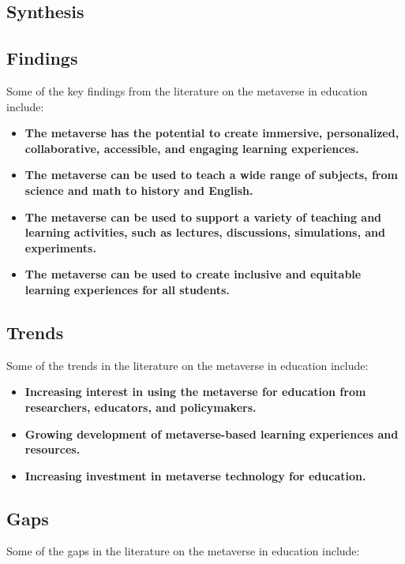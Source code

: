 \documentclass[12pt]{extarticle}
\begin{document}
\subsection{Synthesis}
\subsection*{Findings}

Some of the key findings from the literature on the metaverse in education include:

\begin{itemize}
    \item \textbf{The metaverse has the potential to create immersive, personalized, collaborative, accessible, and engaging learning experiences.}
    \item \textbf{The metaverse can be used to teach a wide range of subjects, from science and math to history and English.}
    \item \textbf{The metaverse can be used to support a variety of teaching and learning activities, such as lectures, discussions, simulations, and experiments.}
    \item \textbf{The metaverse can be used to create inclusive and equitable learning experiences for all students.}
\end{itemize}

\subsection*{Trends}

Some of the trends in the literature on the metaverse in education include:

\begin{itemize}
    \item \textbf{Increasing interest in using the metaverse for education from researchers, educators, and policymakers.}
    \item \textbf{Growing development of metaverse-based learning experiences and resources.}
    \item \textbf{Increasing investment in metaverse technology for education.}
\end{itemize}

\subsection*{Gaps}

Some of the gaps in the literature on the metaverse in education include:
\end{document}
